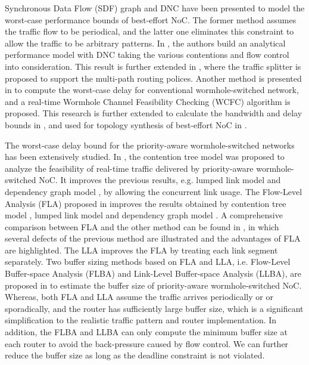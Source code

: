 \documentclass[preprint]{elsarticle}
\begin{document}
Synchronous Data Flow (SDF) graph \cite{poplavko2003task} and DNC \cite{qian2009analysis} have been presented to model the worst-case performance bounds of best-effort NoC. The former method assumes the traffic flow to be periodical, and the latter one eliminates this constraint to allow the traffic to be arbitrary patterns. In \cite{qian2009analysis}, the authors build an analytical performance model with DNC taking the various contentions and flow control into consideration. This result is further extended in \cite{Du:2012:WPA:2380445.2380469}, where the traffic splitter is proposed to support the multi-path routing polices. Another method is presented in \cite{Lee:2003:RWC:846077.846083} to compute the worst-case delay for conventional wormhole-switched network, and a real-time Wormhole Channel Feasibility Checking (WCFC) algorithm is proposed. This research is further extended to calculate the bandwidth and delay bounds in \cite{6109240}, and used for topology synthesis of best-effort NoC in \cite{EPFL-ARTICLE-186879}.

The worst-case delay bound for the priority-aware wormhole-switched networks has been extensively studied. In \cite{LuJS05}, the contention tree model was proposed to analyze the feasibility of real-time traffic delivered by priority-aware wormhole-switched NoC. It improves the previous results, e.g. lumped link model \cite{707545} and dependency graph model \cite{708526}, by allowing the concurrent link usage. The Flow-Level Analysis (FLA) proposed in \cite{Shi:2008:RCA:1397757.1397996} improves the results obtained by contention tree model \cite{LuJS05}, lumped link model \cite{707545} and dependency graph model \cite{708526}. A comprehensive comparison between FLA and the other method can be found in \cite{Shi2009}, in which several defects of the previous method are illustrated and the advantages of FLA are highlighted. The LLA \cite{73} improves the FLA by treating each link segment separately. Two buffer sizing methods based on FLA and LLA, i.e. Flow-Level Buffer-space Analysis (FLBA) and Link-Level Buffer-space Analysis (LLBA), are proposed in \cite{189} to estimate the buffer size of priority-aware wormhole-switched NoC. Whereas, both FLA and LLA assume the traffic arrives periodically or or sporadically, and the router has sufficiently large buffer size, which is a significant simplification to the realistic traffic pattern and router implementation. In addition, the FLBA and LLBA can only compute the minimum buffer size at each router to avoid the back-pressure caused by flow control. We can further reduce the buffer size as long as the deadline constraint is not violated.
\end{document}
